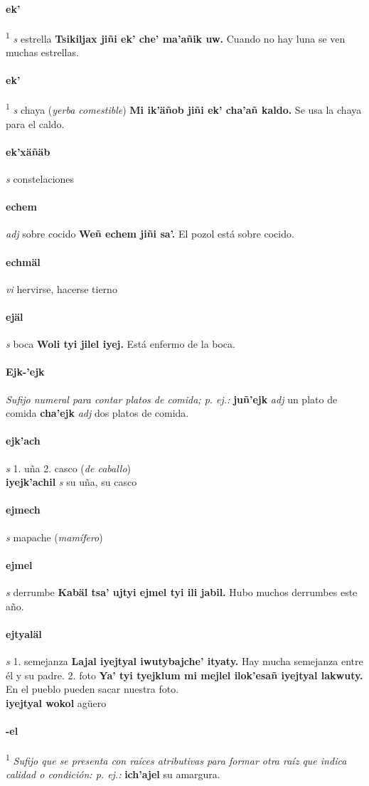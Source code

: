 \documentclass{scrbook}
\newcommand{\entry}[1]{\paragraph{#1}}
\newcommand{\onedefinition}[1]{#1.}
\newcommand{\defsuperscript}[1]{\textsuperscript{1}}
\newcommand{\nontranslationdef}[1]{\textit{#1}}
\newcommand{\partofspeech}[1]{\textit{#1}}
\newcommand{\spanishtranslation}[1]{#1}
\newcommand{\clarification}[1]{(\textit{#1})}
\newcommand{\cholexample}[1]{\textbf{#1}}
\newcommand{\exampletranslation}[1]{#1}
\newcommand{\secondaryentry}[1]{\\\textbf{#1}}
\newcommand{\secondpartofspeech}[1]{\textit{#1}}
\newcommand{\secondtranslation}[1]{#1}
\begin{document}
\begin{multicols}{2}
\entry{ek'}
\defsuperscript{1}
\partofspeech{s}
\spanishtranslation{estrella}
\cholexample{Tsikiljax jiñi ek' che' ma'añik uw.}
\exampletranslation{Cuando no hay luna se ven muchas estrellas.}

\entry{ek'}
\defsuperscript{2}
\partofspeech{s}
\spanishtranslation{chaya}
\clarification{yerba comestible}
\cholexample{Mi ik'äñob jiñi ek' cha'añ kaldo.}
\exampletranslation{Se usa la chaya para el caldo.}

\entry{ek'xäñäb}
\partofspeech{s}
\spanishtranslation{constelaciones}

\entry{echem}
\partofspeech{adj}
\spanishtranslation{sobre cocido}
\cholexample{Weñ echem jiñi sa'.}
\exampletranslation{El pozol está sobre cocido.}

\entry{echmäl}
\partofspeech{vi}
\spanishtranslation{hervirse, hacerse tierno}

\entry{ejäl}
\partofspeech{s}
\spanishtranslation{boca}
\cholexample{Woli tyi jilel iyej.}
\exampletranslation{Está enfermo de la boca.}

\entry{Ejk-'ejk}
\nontranslationdef{Sufijo numeral para contar platos de comida; p. ej.:}
\cholexample{juñ'ejk}
\secondpartofspeech{adj}
\exampletranslation{un plato de comida}
\cholexample{cha'ejk}
\secondpartofspeech{adj}
\secondtranslation{dos platos de comida.}

\entry{ejk'ach}
\partofspeech{s}
\onedefinition{1}
\spanishtranslation{uña}
\onedefinition{2}
\spanishtranslation{casco}
\clarification{de caballo}
\secondaryentry{iyejk'achil}
\secondpartofspeech{s}
\secondtranslation{su uña, su casco}

\entry{ejmech}
\partofspeech{s}
\spanishtranslation{mapache}
\clarification{mamífero}

\entry{ejmel}
\partofspeech{s}
\spanishtranslation{derrumbe}
\cholexample{Kabäl tsa' ujtyi ejmel tyi ili jabil.}
\exampletranslation{Hubo muchos derrumbes este año.}

\entry{ejtyaläl}
\partofspeech{s}
\onedefinition{1}
\spanishtranslation{semejanza}
\cholexample{Lajal iyejtyal iwutybajche' ityaty.}
\exampletranslation{Hay mucha semejanza entre él y su padre.}
\onedefinition{2}
\spanishtranslation{foto}
\cholexample{Ya' tyi tyejklum mi mejlel ilok'esañ iyejtyal lakwuty.}
\exampletranslation{En el pueblo pueden sacar nuestra foto.}
\secondaryentry{iyejtyal wokol}
\secondtranslation{agüero}

\entry{-el}
\defsuperscript{1}
\nontranslationdef{Sufijo que se presenta con raíces atributivas para formar otra raíz que indica calidad o condición: p. ej.:}
\cholexample{ich'ajel}
\exampletranslation{su amargura.}


\end{multicols}
\end{document}
